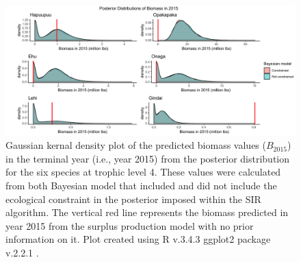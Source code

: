 \documentclass[oneside,12pt,final]{sty/ucthesis-CA2012}
\let\cite\citep                             %
\begin{document}
\begin{mainmatter}
\begin{figure}[H]
     \centering
       \includegraphics[width=\textwidth]{fig/post_terminal_bio}
    \caption{Gaussian kernal density plot of the predicted biomass values ($B_{2015}$) in the terminal year (i.e., year 2015) from the posterior distribution for the six species at trophic level 4. These values were calculated from both Bayesian model that included and did not include the ecological constraint in the posterior imposed within the SIR algorithm. The vertical red line represents the biomass predicted in year 2015 from the surplus production model with no prior information on it. Plot created using R v.3.4.3 \cite{Rcite} ggplot2 package v.2.2.1 \cite{ggplot}.}
    \label{post_terminal}
\end{figure}


\end{mainmatter}
\end{document}
